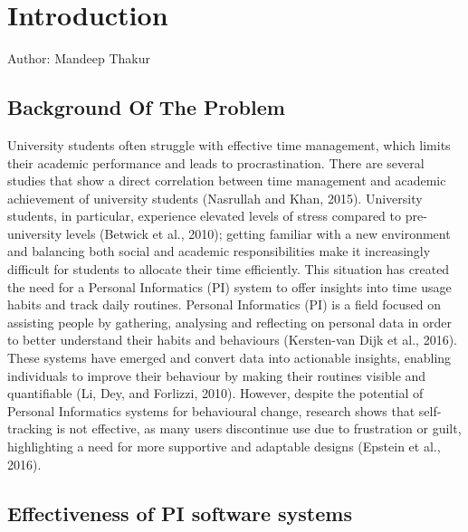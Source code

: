 \documentclass[12pt,a4paper]{article}
\begin{document}
\tableofcontents
\newpage




\section{Introduction}
Author: Mandeep Thakur
\subsection{Background Of The Problem}
University students often struggle with effective time management, which limits their academic performance and leads to procrastination. There are several studies that show a direct correlation between time management and academic achievement of university students (Nasrullah and Khan, 2015). University students, in particular, experience elevated levels of stress compared to pre-university levels (Betwick et al., 2010); getting familiar with a new environment and balancing both social and academic responsibilities make it increasingly difficult for students to allocate their time efficiently. This situation has created the need for a Personal Informatics (PI) system to offer insights into time usage habits and track daily routines. Personal Informatics (PI) is a field focused on assisting people by gathering, analysing and reflecting on personal data in order to better understand their habits and behaviours (Kersten-van Dijk et al., 2016). These systems have emerged and convert data into actionable insights, enabling individuals to improve their behaviour by making their routines visible and quantifiable (Li, Dey, and Forlizzi, 2010). However, despite the potential of Personal Informatics systems for behavioural change, research shows that self-tracking is not effective, as many users discontinue use due to frustration or guilt, highlighting a need for more supportive and adaptable designs (Epstein et al., 2016).

\subsection{Effectiveness of PI software systems}
\end{document}
